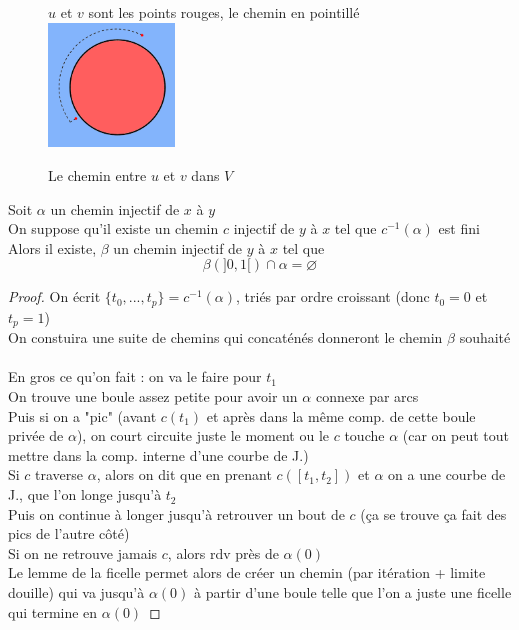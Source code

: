 \documentclass{article}
\begin{document}
\begin{flushleft}
\begin{figure}[h]
    \caption{Le chemin entre $u$ et $v$ dans $V$}
    \centering
    $u$ et $v$ sont les points rouges, le chemin en pointillé\\
    \includegraphics[width = 0.3\textwidth]{Chemin radial.png}
\end{figure}

\begin{tcolorbox}[colback = purple!20!white, colframe = purple!60!white, title = Proposition]
    Soit $\alpha$ un chemin injectif de $x$ à $y$\\
    On suppose qu'il existe un chemin $c$ injectif de $y$ à $x$ tel que $c^{-1}(\alpha)$ est fini\\
    Alors il existe, $\beta$ un chemin injectif de $y$ à $x$ tel que
    \[ \beta(]0, 1[) \cap \alpha = \varnothing \]
\end{tcolorbox}

\begin{proof}
    On écrit $\{t_0, ..., t_p\} = c^{-1}(\alpha)$, triés par ordre croissant (donc $t_0 = 0$ et $t_p = 1$)\\
    On constuira une suite de chemins qui concaténés donneront le chemin $\beta$ souhaité
    \\~\\
    En gros ce qu'on fait : on va le faire pour $t_1$\\
    On trouve une boule assez petite pour avoir un $\alpha$ connexe par arcs\\
    Puis si on a "pic" (avant $c(t_1)$ et après dans la même comp. de cette boule privée de $\alpha$), on court circuite juste
    le moment ou le $c$ touche $\alpha$ (car on peut tout mettre dans la comp. interne d'une courbe de J.)\\
    Si $c$ traverse $\alpha$, alors on dit que en prenant $c([t_1, t_2])$ et $\alpha$ on a une courbe de J., que l'on longe jusqu'à $t_2$\\
    Puis on continue à longer jusqu'à retrouver un bout de $c$ (ça se trouve ça fait des pics de l'autre côté)\\
    Si on ne retrouve jamais $c$, alors rdv près de $\alpha(0)$\\
    Le lemme de la ficelle permet alors de créer un chemin (par itération + limite douille) qui va jusqu'à $\alpha(0)$ à partir
    d'une boule telle que l'on a juste une ficelle qui termine en $\alpha(0)$


\end{proof}
\end{flushleft}
\end{document}
